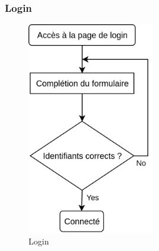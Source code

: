 \documentclass[a4paper, 12pt]{article}
\begin{document}
\subsubsection{Login}
\begin{figure}
	\begin{center}
		\includegraphics[width=0.5\textwidth]{../diagrams/login.png}
	\end{center}
    \caption{Login}
\end{figure}
\end{document}
